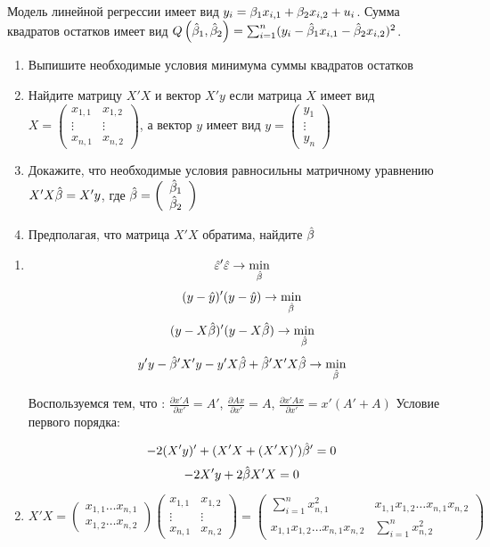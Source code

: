 \begin{problem}
Модель линейной регрессии имеет вид $y_i=\beta_1 x_{i,1}+\beta_2 x_{i,2} + u_i$.
Сумма квадратов остатков имеет вид $Q\left(\hat{\beta}_1,\hat{\beta}_2\right)=\sum_{i=1}^n (y_i - \hat{\beta}_1 x_{i,1}-\hat{\beta}_2 x_{i,2})^2$.
\begin{enumerate}
\item Выпишите необходимые условия минимума суммы квадратов остатков
\item Найдите матрицу $X'X$ и вектор $X'y$ если матрица $X$ имеет вид
$X=
\left(
\begin{array}{cc}
x_{1,1} & x_{1,2} \\
\vdots & \vdots \\
x_{n,1} & x_{n,2}
\end{array}
\right)
$,
а вектор $y$ имеет вид
$y=
\left(
\begin{array}{c}
y_1 \\
\vdots \\
y_n
\end{array}
\right)
$
\item Докажите, что необходимые условия равносильны матричному уравнению $X'X\hat{\beta}=X'y$, где
$\hat{\beta}=
\left(
\begin{array}{c}
\hat{\beta}_1 \\
\hat{\beta}_2
\end{array}
\right)
$
\item Предполагая, что матрица $X'X$ обратима, найдите $\hat{\beta}$
\end{enumerate}

\begin{sol}
\begin{enumerate}
\item
\[\hat{\varepsilon}'\hat{\varepsilon}\rightarrow \min_{\hat{\beta}}\]
\[(y-\hat{y})'(y-\hat{y})\rightarrow\min_{\hat{\beta}}\]
\[(y-X\hat{\beta})'(y-X\hat{\beta})\rightarrow\min_{\hat{\beta}}\]
\[y'y-\hat{\beta}' X'y-y'X\hat{\beta}+\hat{\beta}'X'X\hat{\beta}\rightarrow\min_{\hat{\beta}}\]

Воспользуемся тем, что : $\frac{\partial x'A}{\partial x'}=A'$, $\frac{\partial Ax}{\partial x'}=A$,
$\frac{\partial x'Ax}{\partial x'}=x'(A'+A)$
Условие первого порядка:

\[-2(X'y)'+(X'X+(X'X)')\hat{\beta}'=0\]
\[-2X'y+2\hat{\beta} X'X=0\]

\item
$X'X=\begin{pmatrix}
x_{1,1}\ldots x_{n,1}\\
x_{1,2}\ldots x_{n,2}
\end{pmatrix}
\begin{pmatrix}
x_{1,1}& x_{1,2}\\
\vdots&\vdots\\
x_{n,1}& x_{n,2}
\end{pmatrix}=
\begin{pmatrix}
\sum_{i=1}^n x^2_{n,1}& x_{1,1}x_{1,2}\ldots x_{n,1}x_{n,2}\\
x_{1,1}x_{1,2}\ldots x_{n,1}x_{n,2}&\sum_{i=1}^nx^2_{n,2}
\end{pmatrix}$


\end{enumerate}
\end{sol}
\end{problem}
